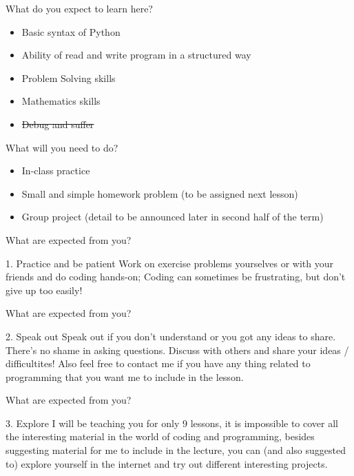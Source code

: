 \documentclass[10pt,xcolor={table,dvipsnames},t]{beamer}
\begin{document}
\begin{frame}{What do you expect to learn here?}
  \begin{itemize}
    \item Basic syntax of Python
    \item Ability of read and write program in a structured way
    \item Problem Solving skills
    \item Mathematics skills
    \item \sout{Debug and suffer}
  \end{itemize}
\end{frame}

\begin{frame}{What will you need to do?}
  \begin{itemize}
    \item In-class practice
    \item Small and simple homework problem (to be assigned next lesson)
    \item Group project (detail to be announced later in second half of the term)
  \end{itemize}
\end{frame}

\begin{frame}{What are expected from you?}
  \begin{block}{1. Practice and be patient}
    Work on exercise problems yourselves or with your friends and do coding hands-on; Coding can sometimes be frustrating, but don't give up too easily!
  \end{block}
\end{frame}
\begin{frame}{What are expected from you?}
  \begin{block}{2. Speak out}
    Speak out if you don't understand or you got any ideas to share. There's no shame in asking questions. Discuss with others and share your ideas / difficultites! Also feel free to contact me if you have any thing related to programming that you want me to include in the lesson.
  \end{block}
\end{frame}
\begin{frame}{What are expected from you?}
  \begin{block}{3. Explore}
    I will be teaching you for only 9 lessons, it is impossible to cover all the interesting material in the world of coding and programming, besides suggesting material for me to include in the lecture, you can (and also suggested to) explore yourself in the internet and try out different interesting projects.
  \end{block}
\end{frame}
\end{document}
